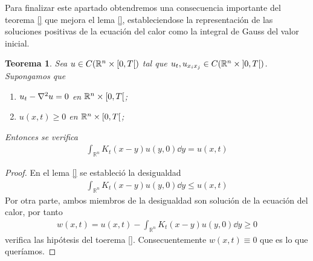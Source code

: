 \documentclass{article}
\newcommand{\realNumbers}{\mathbb{R}}
\newtheorem{theorem}{Teorema}
\theoremstyle{definition}
\theoremstyle{remark}
\newcommand{\leftOpenInterval}{\left]}
\newcommand{\rightOpenInterval}{\right[}
\newcommand{\leftClosedInterval}{\left[}
\newcommand{\rightClosedInterval}{\right]}
\newcommand{\interval}[3]{%
  \ifstrequal{#1}{oo}{%
    \leftOpenInterval #2, #3 \rightOpenInterval%
  }{%
    \ifstrequal{#1}{co}{%
      \leftClosedInterval #2, #3 \rightOpenInterval%
    }{%
      \ifstrequal{#1}{oc}{
        \leftOpenInterval #2, #3 \rightClosedInterval%
      }{%
        \ifstrequal{#1}{cc}{
          \leftClosedInterval #2, #3 \rightClosedInterval
        }{%
        }%
      }%
    }%
  }%
}
\begin{document}
  Para finalizar este apartado obtendremos una consecuencia importante del teorema \ref{}  %
  que mejora el lema \ref{},  %
  estableciendose la representación de las soluciones positivas de la ecuación del calor como la integral de Gauss del valor inicial.

  \begin{theorem}
    Sea \(u \in C(\realNumbers^n \times \interval{co}{0}{T})\) tal que \(u_t, u_{x_i x_j} \in C(\realNumbers^n \times \interval{oo}{0}{T})\).
    Supongamos que
    \begin{enumerate}
      \item \(u_t - \laplacian u = 0\) en \( \realNumbers^n \times \interval{co}{0}{T}\);
      \item \(u(x, t) \geq 0\) en \( \realNumbers^n \times \interval{co}{0}{T}\);
    \end{enumerate}
    Entonces se verifica
    \begin{align}
      \int_{\realNumbers^n} K_t(x - y) u(y, 0) \dd y
      =
      u(x, t)
    \end{align}
  \end{theorem}
  \begin{proof}
    En el lema \ref{}  %
    se estableció la desigualdad
    \begin{align}
      \int_{\realNumbers^n} K_t(x - y) u(y, 0) \dd y
      \leq
      u(x, t)
    \end{align}
    Por otra parte, ambos miembros de la desigualdad son solución de la ecuación del calor, por tanto
    \begin{align}
      w(x, t)
      =
      u(x, t) - \int_{\realNumbers^n} K_t(x - y) u(y, 0) \dd y
      \geq
      0
    \end{align}
    verifica las hipótesis del toerema \ref{}.  %
    Consecuentemente \(w(x, t) \equiv 0\) que es lo que queríamos.
  \end{proof}
\end{document}
